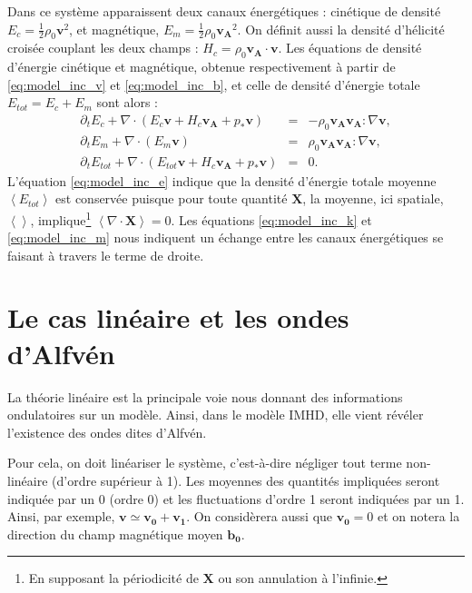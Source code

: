 Dans ce système apparaissent deux canaux énergétiques : cinétique de densité $E_c = \frac{1}{2} \rho_0 \boldsymbol{v}^2$, et magnétique, $E_m = \frac{1}{2} \rho_0 \boldsymbol{v_A}^2$. On définit aussi la densité d'hélicité croisée couplant les deux champs : $H_c = \rho_0 \boldsymbol{v_A} \cdot \boldsymbol{v}$. Les équations de densité d'énergie cinétique et magnétique, obtenue respectivement à partir de \eqref{eq:model_inc_v} et  \eqref{eq:model_inc_b}, et celle de densité d'énergie totale $E_{tot} = E_c + E_m$ sont alors : 
\begin{eqnarray}
 \label{eq:model_inc_k} \partial_t E_c +   \nabla  \cdot (E_c \boldsymbol{v}+ H_c \boldsymbol{v_A} + p_* \boldsymbol{v}  )  &=& - \rho_0  \boldsymbol{v_A} \boldsymbol{v_A} : \nabla \boldsymbol{v}, \\
 \label{eq:model_inc_m} \partial_t E_m +   \nabla  \cdot (E_m \boldsymbol{v}) &=& \rho_0   \boldsymbol{v_A} \boldsymbol{v_A} : \nabla \boldsymbol{v} ,\\
\label{eq:model_inc_e} \partial_t E_{tot} +   \nabla  \cdot (E_{tot} \boldsymbol{v} + H_c \boldsymbol{v_A} + p_* \boldsymbol{v} )  &=&  0.
\end{eqnarray}
L'équation \eqref{eq:model_inc_e} indique que la densité d'énergie totale moyenne $\left<E_{tot}\right>$ est conservée puisque pour toute quantité $\boldsymbol{X}$, la moyenne, ici spatiale, $\left<\right>$, implique\footnote{En supposant la périodicité de $\boldsymbol{X}$ ou son annulation à l'infinie.} $\left<\nabla \cdot \boldsymbol{X}\right> = 0$. Les équations \eqref{eq:model_inc_k} et \eqref{eq:model_inc_m} nous indiquent un échange entre les canaux énergétiques se faisant à travers le terme de droite. 

\section{Le cas linéaire et les ondes d'Alfvén}
La théorie linéaire est la principale voie nous donnant des informations ondulatoires sur un modèle. Ainsi, dans le modèle \acs{IMHD}, elle vient révéler l'existence des ondes dites d'Alfvén. 

Pour cela, on doit linéariser le système, c'est-à-dire négliger tout terme non-linéaire (d'ordre supérieur à 1). 
Les moyennes des quantités impliquées seront indiquée par un 0 (ordre 0) et les fluctuations d'ordre 1 seront indiquées par un 1. Ainsi, par exemple, $\boldsymbol{v} \simeq \boldsymbol{v_{0}} + \boldsymbol{v_{1}}$. On considèrera aussi que $\boldsymbol{v_{0}} = 0$ et on notera la direction du champ magnétique moyen $\boldsymbol{b_0}$. 

